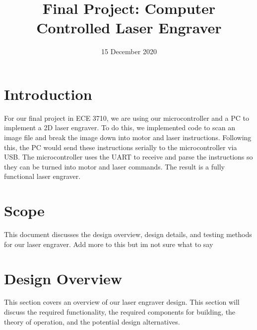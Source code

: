 \documentclass[11pt]{LaTeX-Classes/math-hw}
\title{Final Project: Computer Controlled Laser Engraver}
\date{15 December 2020}
\begin{document}
\maketitle

\section*{Introduction}
For our final project in ECE 3710, we are using our microcontroller and a PC to implement a 2D laser engraver. To do this, we implemented code to scan an image file and break the image down into motor and laser instructions. Following this, the PC would send these instructions serially to the microcontroller via USB. The microcontroller uses the UART to receive and parse the instructions so they can be turned into motor and laser commands. The result is a fully functional laser engraver.

\section*{Scope}
This document discusses the design overview, design details, and testing methods for our laser engraver. Add more to this but im not sure what to say

\section*{Design Overview}
This section covers an overview of our laser engraver design. This section will discuss the required functionality, the required components for building, the theory of operation, and the potential design alternatives. 
\end{document}
